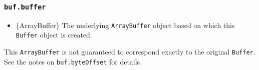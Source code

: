 \begin{Shaded}
\begin{Highlighting}[]
\NormalTok{ \{ }\NormalTok{ \} }\OperatorTok{=} \NormalTok{(}\NormalTok{)}\OperatorTok{;}


\OperatorTok{=} \OperatorTok{;}
\OperatorTok{=} \NormalTok{)}\OperatorTok{;}

\NormalTok{ (}\OperatorTok{=} \OperatorTok{;}\OperatorTok{\textless{}}\OperatorTok{;}\OperatorTok{++}\NormalTok{) \{}
\OperatorTok{=}\OperatorTok{;}
\NormalTok{\}}

\NormalTok{(}\NormalTok{))}\OperatorTok{;}
\end{Highlighting}
\end{Shaded}

\subsubsection{\texorpdfstring{\texttt{buf.buffer}}{buf.buffer}}\label{buf.buffer}

\begin{itemize}
\tightlist
\item
  \{ArrayBuffer\} The underlying \texttt{ArrayBuffer} object based on
  which this \texttt{Buffer} object is created.
\end{itemize}

This \texttt{ArrayBuffer} is not guaranteed to correspond exactly to the
original \texttt{Buffer}. See the notes on \texttt{buf.byteOffset} for
details.

